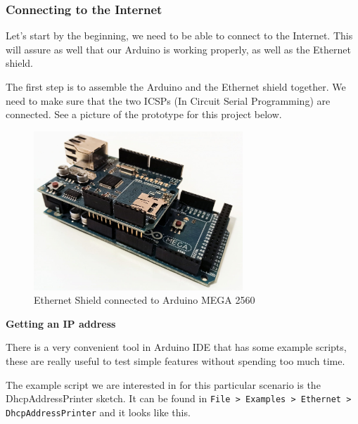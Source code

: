 \vspace{7mm}
\subsubsection{Connecting to the Internet}
Let's start by the beginning, we need to be able to connect to the Internet. This will assure as well that our Arduino is working properly, as well as the Ethernet shield.

The first step is to assemble the Arduino and the Ethernet shield together. We need to make sure that the two ICSPs (In Circuit Serial Programming) are connected. See a picture of the prototype for this project below.

\begin{figure}[H]
    \centering
    \includegraphics[width=0.7\textwidth]{fig/ethernet-connected.jpg}
    \caption{Ethernet Shield connected to Arduino MEGA 2560}
    \label{fig:ethernet-connected}
\end{figure}

\vspace{7mm}

\textbf{Getting an IP address}

There is a very convenient tool in Arduino IDE that has some example scripts, these are really useful to test simple features without spending too much time.

The example script we are interested in for this particular scenario is the DhcpAddressPrinter sketch. It can be found in \verb|File > Examples > Ethernet > DhcpAddressPrinter| and it looks like this.

\vspace{5mm}



\vspace{7mm}

